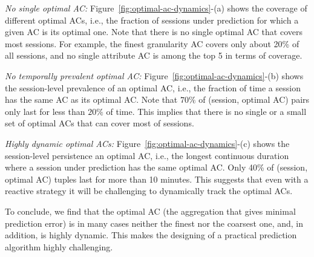  
\begin{packeditemize}
	\item {\it No single optimal AC:} Figure~\ref{fig:optimal-ac-dynamics}-(a) shows the coverage of different optimal ACs, i.e., the fraction of sessions under prediction for which a given AC is its optimal one. Note that there is no single optimal AC that covers most sessions. For example, the finest granularity AC covers only about 20\% of all sessions, and no single attribute AC is among the top 5 in terms of coverage. 
	\item {\it No temporally prevalent optimal AC:} Figure~\ref{fig:optimal-ac-dynamics}-(b) shows the session-level prevalence of an optimal AC, i.e., the fraction of time a session has the same AC as its optimal AC. Note that $70\%$ of (session, optimal AC) pairs only last for less than $20\%$ of time. This implies that there is no single or a small set of optimal ACs that can cover most of sessions.
	\item {\it Highly dynamic optimal ACs:} Figure~\ref{fig:optimal-ac-dynamics}-(c) shows the session-level persistence an optimal AC, i.e., the longest continuous duration where a session under prediction has the same optimal AC. Only 40\% of (session, optimal AC) tuples last for more than 10 minutes. This suggests that even with a reactive strategy it will be challenging to dynamically track the optimal ACs.
\end{packeditemize}

To conclude, we find that the optimal AC (the aggregation that gives minimal prediction error) is in many cases neither the finest nor the coarsest one, and, in addition, is highly dynamic. This makes the designing of a practical prediction algorithm highly challenging.


